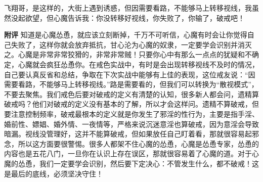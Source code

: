 \begin{case}
    飞翔哥，是这样的，大街上遇到诱惑，但因需要看路，不能够马上转移视线，我虽然没起欲望，但心魔告诉我：你没转移好视线，你失败了，你输了，破戒吧！

    \textbf{附评} 知道是心魔怂恿，就应该立刻断掉，千万不可听信，心魔有时会让你觉得自己失败了，这样你就会放弃抵抗，甘心沦为心魔的奴隶，一定要学会识别并消灭之。心魔是非常非常狡猾的，非常非常贼！只要你心中有那么一点点的犹疑和不确定，心魔就会疯狂怂恿你。在戒色实战中，有时是会出现转移视线不及时的情况，自己要认真反省和总结，争取在下次实战中能够有上佳的表现，这位戒友说：“因需要看路，不能够马上转移视线。”路是需要看的，但我们可以转换为“散视模式”，不要去聚焦。我们戒色后要对破戒的定义有清楚的认知，很多新人都会问，遗精算破戒吗？他们对破戒的定义没有基本的了解，所以才会这样问。遗精不算破戒，但要注意控制频率，破戒最根本的定义就是你发生了邪淫的性行为，主要是指手淫、婚前性、嫖娼、婚外情、一夜情等，严格来说沉迷意淫也算破戒，因为意淫会导致暗漏。视线没管理好，这并不能算破戒，但如果放任自己盯着看，那就很容易起邪念，所以这方面要很警惕。很多人都架不住心魔的怂恿，心魔是怂恿专家，怂恿的内容也是五花八门，一旦你在认识上存在误区，那就很容易着了心魔的道。对于心魔的怂恿，我们一定要学会识别，然后要下定决心：不管发生什么，都不破戒！这是最后的底线，必须坚决守住！
\end{case}

